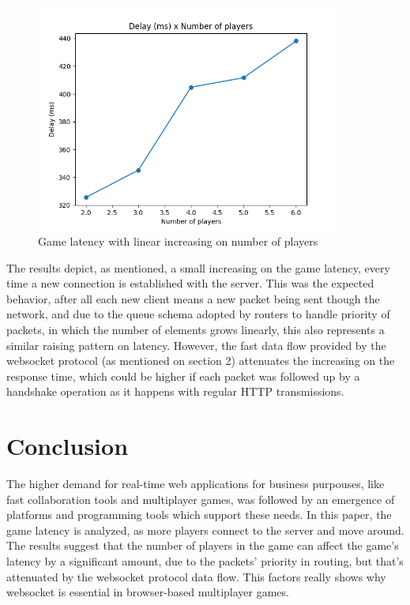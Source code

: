 \documentclass[english]{sbrt}
\begin{document}
\begin{figure}[H]
  \centering
  \includegraphics[width=10cm]{graphs/graph.png}
  \caption{Game latency with linear increasing on number of players}
  \label{latency}
\end{figure}

The results depict, as mentioned, a small increasing on the game latency, every time a new connection is established with the server. This was the expected behavior, after all each new client means a new packet being sent though the network, and due to the queue schema adopted by routers to handle priority of packets, in which the number of elements grows linearly, this also represents a similar raising pattern on latency. However, the fast data flow provided by the websocket protocol (as mentioned on section 2) attenuates the increasing on the response time, which could be higher if each packet was followed up by a handshake operation as it happens with regular HTTP transmissions.

\section{\textbf{Conclusion}}

The higher demand for real-time web applications for business purpouses, like fast collaboration tools and multiplayer games, was followed by an emergence of platforms and programming tools which support these needs. In this paper, the game latency is analyzed, as more players connect to the server and move around. The results suggest that the number of players in the game can affect the game's latency by a significant amount, due to the packets' priority in routing, but that's attenuated by the websocket protocol data flow. This factors really shows why websocket is essential in browser-based multiplayer games.



\end{document}
